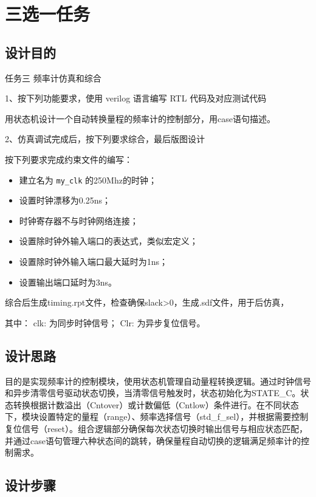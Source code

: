 \chapter{三选一任务}

\section{设计目的}

任务三 频率计仿真和综合

1、按下列功能要求，使用 verilog 语言编写 RTL 代码及对应测试代码

用状态机设计一个自动转换量程的频率计的控制部分，用case语句描述。

2、仿真调试完成后，按下列要求综合，最后版图设计

按下列要求完成约束文件的编写：

\begin{itemize}
    \item 建立名为 \texttt{my\_clk} 的250Mhz的时钟；
    \item 设置时钟漂移为0.25ns；
    \item 时钟寄存器不与时钟网络连接；
    \item 设置除时钟外输入端口的表达式，类似宏定义；
    \item 设置除时钟外输入端口最大延时为1ns；
    \item 设置输出端口延时为3ns。
\end{itemize}

综合后生成timing.rpt文件，检查确保slack>0，生成.sdf文件，用于后仿真，

其中：
clk: 为同步时钟信号；
Clr: 为异步复位信号。

\section{设计思路}

目的是实现频率计的控制模块，使用状态机管理自动量程转换逻辑。通过时钟信号和异步清零信号驱动状态切换，当清零信号触发时，状态初始化为STATE\_C。状态转换根据计数溢出（Cntover）或计数偏低（Cntlow）条件进行。在不同状态下，模块设置特定的量程（range）、频率选择信号（std\_f\_sel），并根据需要控制复位信号（reset）。组合逻辑部分确保每次状态切换时输出信号与相应状态匹配，并通过case语句管理六种状态间的跳转，确保量程自动切换的逻辑满足频率计的控制需求。


\section{设计步骤}

